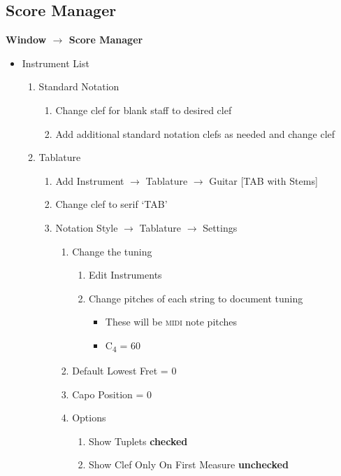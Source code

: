 \documentclass[]{memoir}
\begin{document}
\subsection{Score Manager}
\label{sec:score-manager}

\textbf{Window $\rightarrow$ Score Manager}

\begin{itemize}
\item Instrument List
  \begin{enumerate}
  \item Standard Notation
    \begin{enumerate}
    \item Change clef for blank staff to desired clef
    \item Add additional standard notation clefs as needed and change
      clef
    \end{enumerate}
  \item Tablature
    \begin{enumerate}
    \item Add Instrument $\rightarrow$ Tablature $\rightarrow$ Guitar [TAB with Stems]
    \item Change clef to serif `TAB'
    \item Notation Style $\rightarrow$ Tablature $\rightarrow$ Settings
      \begin{enumerate}
      \item Change the tuning
        \begin{enumerate}
        \item Edit Instruments
        \item Change pitches of each string to document tuning
          \begin{itemize}
          \item These will be \textsc{midi} note pitches
          \item C\textsubscript{4} = 60
          \end{itemize}
        \end{enumerate}
      \item Default Lowest Fret = 0
      \item Capo Position = 0
      \item Options
        \begin{enumerate}
        \item Show Tuplets \textbf{checked}
        \item Show Clef Only On First Measure \textbf{unchecked}
        \end{enumerate}

\end{enumerate}
\end{enumerate}
\end{enumerate}
\end{itemize}
\end{document}
